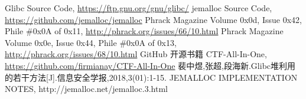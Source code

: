 \begin{thebibliography}{}  
 Glibc Source Code, \url{https://ftp.gnu.org/gnu/glibc/}
 jemalloc Source Code, \url{https://github.com/jemalloc/jemalloc}
 Phrack Magazine Volume 0x0d, Issue 0x42, Phile \#0x0A of 0x11, \url{http://phrack.org/issues/66/10.html}
 Phrack Magazine Volume 0x0e, Issue 0x44, Phile \#0x0A of 0x13, \url{http://phrack.org/issues/68/10.html}
 GitHub 开源书籍 CTF-All-In-One, \url{https://github.com/firmianay/CTF-All-In-One}
 裴中煜,张超,段海新.Glibc堆利用的若干方法[J].信息安全学报,2018,3(01):1-15.
 JEMALLOC IMPLEMENTATION NOTES, http://jemalloc.net/jemalloc.3.html
\end{thebibliography}
